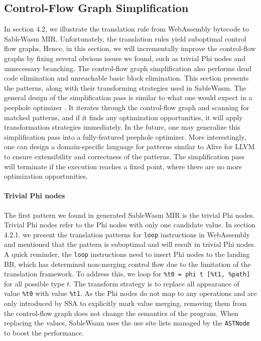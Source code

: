 \subsection{Control-Flow Graph Simplification}

In section 4.2, we illustrate the translation rule from WebAssembly bytecode to SableWasm MIR. Unfortunately, the translation rules yield suboptimal control flow graphs. Hence, in this section, we will incrementally improve the control-flow graphs by fixing several obvious issues we found, such as trivial Phi nodes and unnecessary branching. The control-flow graph simplification also performs dead code elimination and unreachable basic block elimination. This section presents the patterns, along with their transforming strategies used in SableWasm. The general design of the simplification pass is similar to what one would expect in a peephole optimizer \cite{peephole-opt}. It iterates through the control-flow graph and scanning for matched patterns, and if it finds any optimization opportunities, it will apply transformation strategies immediately. In the future, one may generalize this simplification pass into a fully-featured peephole optimizer. More interestingly, one can design a domain-specific language for patterns similar to Alive \cite{alive, alive-in-lean} for LLVM to ensure extensibility and correctness of the patterns. The simplification pass will terminate if the execution reaches a fixed point, where there are no more optimization opportunities.

\paragraph{Trivial Phi nodes}
The first pattern we found in generated  SableWasm MIR is the trivial Phi nodes. Trivial Phi nodes refer to the Phi nodes with only one candidate value. In section 4.2.1. we present the translation patterns for \texttt{loop} instructions in WebAssembly and mentioned that the pattern is suboptimal and will result in trivial Phi nodes. A quick reminder, the \texttt{loop} instructions need to insert Phi nodes to the landing BB, which has determined non-merging control flow due to the limitation of the translation framework. To address this, we loop for \texttt{\%t0 = phi t [\%t1, \%path]} for all possible type $t$. The transform strategy is to replace all appearance of value \texttt{\%t0} with value \texttt{\%t1}. As the Phi nodes do not map to any operations and are only introduced by SSA to explicitly mark value merging, removing them from the control-flow graph does not change the semantics of the program. When replacing the values, SableWsam uses the use site lists managed by the \texttt{ASTNode} to boost the performance.

